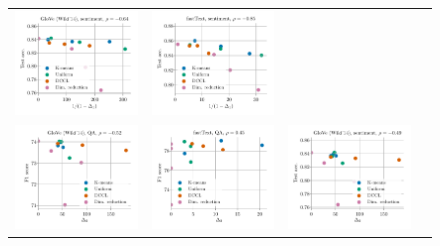 \begin{figure}
\begin{tabular}{@{\hskip -0.0in}c@{\hskip -0.0in}c@{\hskip -0.0in}c@{\hskip -0.0in}c@{\hskip -0.0in}}
		\includegraphics[width=.245\linewidth]{figures/glove400k_sentiment_sst_test-acc_vs_gram-large-dim-delta1-2-trans_linx_stoc_ave-pt.pdf} &
		\includegraphics[width=.245\linewidth]{figures/fasttext1m_sentiment_sst_test-acc_vs_gram-large-dim-delta1-2-trans_linx_stoc_ave-pt.pdf} \\
		\includegraphics[width=.245\linewidth]{figures/glove400k_qa_best-f1_vs_gram-large-dim-delta2-2_linx_stoc_ave-pt.pdf} &
		\includegraphics[width=.245\linewidth]{figures/fasttext1m_qa_best-f1_vs_gram-large-dim-delta2-2_linx_stoc_ave-pt.pdf} &
		\includegraphics[width=.245\linewidth]{figures/glove400k_sentiment_sst_test-acc_vs_gram-large-dim-delta2-2_linx_stoc_ave-pt.pdf} &

\end{tabular}
\end{figure}
